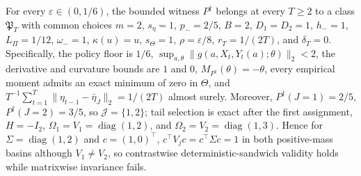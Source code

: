 For every \(\varepsilon\in(0,1/6)\), the bounded witness \(P^{\dagger}\) belongs at every \(T\ge2\) to a class \(\mathfrak P_T\) with common choices \(m=2\), \(s_\eta=1\), \(p_-=2/5\), \(B=2\), \(D_1=D_2=1\), \(h_-=1\), \(L_\Pi=1/12\), \(\omega_-=1\), \(\kappa(u)=u\), \(s_\Theta=1\), \(\rho=\varepsilon/8\), \(r_T=1/(2T)\), and \(\delta_T=0\). Specifically, the policy floor is \(1/6\), \(\sup_{a,\theta}\|g(a,X_t,Y_t(a);\theta)\|_2<2\), the derivative and curvature bounds are \(1\) and \(0\), \(M_{P^{\dagger}}(\theta)=-\theta\), every empirical moment admits an exact minimum of zero in \(\Theta\), and \(T^{-1}\sum_{t=1}^T\|\eta_{t-1}-\bar\eta_J\|_2=1/(2T)\) almost surely. Moreover, \(P^{\dagger}(J=1)=2/5\), \(P^{\dagger}(J=2)=3/5\), so \(\mathcal J=\{1,2\}\); tail selection is exact after the first assignment, \(H=-I_2\), \(\Omega_1=V_1=\operatorname{diag}(1,2)\), and \(\Omega_2=V_2=\operatorname{diag}(1,3)\). Hence for \(\Sigma=\operatorname{diag}(1,2)\) and \(c=(1,0)^\top\), \(c^\top V_jc=c^\top\Sigma c=1\) in both positive-mass basins although \(V_1\ne V_2\), so contrastwise deterministic-sandwich validity holds while matrixwise invariance fails.